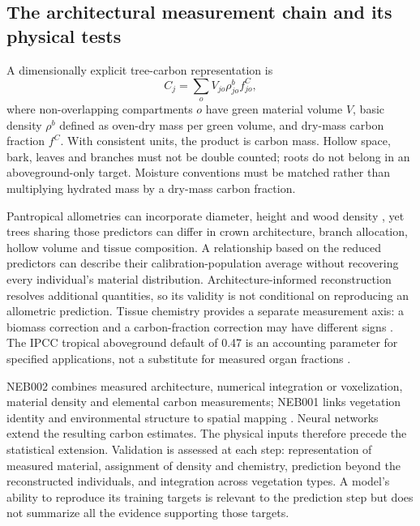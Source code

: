 \documentclass[11pt,a4paper]{article}
\theoremstyle{remark}
\begin{document}
\subsection{The architectural measurement chain and its physical tests}\label{sec:measurement}
A dimensionally explicit tree-carbon representation is
\begin{equation}
C_j=\sum_o V_{jo}\rho^{b}_{jo}f^{C}_{jo},
\label{eq:treecarbon}
\end{equation}
where non-overlapping compartments $o$ have green material volume $V$, basic density $\rho^b$ defined as oven-dry mass per green volume, and dry-mass carbon fraction $f^C$. With consistent units, the product is carbon mass. Hollow space, bark, leaves and branches must not be double counted; roots do not belong in an aboveground-only target. Moisture conventions must be matched rather than multiplying hydrated mass by a dry-mass carbon fraction.

Pantropical allometries can incorporate diameter, height and wood density \citep{Chave2014}, yet trees sharing those predictors can differ in crown architecture, branch allocation, hollow volume and tissue composition. A relationship based on the reduced predictors can describe their calibration-population average without recovering every individual's material distribution. Architecture-informed reconstruction resolves additional quantities, so its validity is not conditional on reproducing an allometric prediction. Tissue chemistry provides a separate measurement axis: a biomass correction and a carbon-fraction correction may have different signs \citep{Martin2011}. The IPCC tropical aboveground default of 0.47 is an accounting parameter for specified applications, not a substitute for measured organ fractions \citep{IPCC2006}.

NEB002 combines measured architecture, numerical integration or voxelization, material density and elemental carbon measurements; NEB001 links vegetation identity and environmental structure to spatial mapping \citep{NEBIOTMethods}. Neural networks extend the resulting carbon estimates. The physical inputs therefore precede the statistical extension. Validation is assessed at each step: representation of measured material, assignment of density and chemistry, prediction beyond the reconstructed individuals, and integration across vegetation types. A model's ability to reproduce its training targets is relevant to the prediction step but does not summarize all the evidence supporting those targets.
\end{document}
